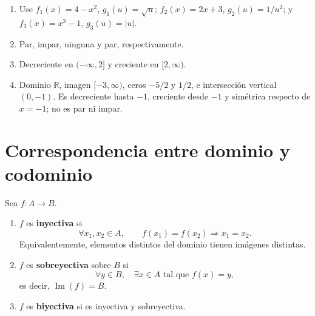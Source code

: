 \documentclass[10pt,a5paper]{article}
\begin{document}
\begin{solucion}
\begin{enumerate}
\[  \]
  \[
  (g\circ f)(x)=x-1,\quad \operatorname{Dom}=[1,\infty).
  \]
  \item Use $f_1(x)=4-x^2$, $g_1(u)=\sqrt{u}$; $f_2(x)=2x+3$, $g_2(u)=1/u^2$; y $f_3(x)=x^3-1$, $g_3(u)=|u|$.
  \item Par, impar, ninguna y par, respectivamente.
  \item Decreciente en $(-\infty,2]$ y creciente en $[2,\infty)$.
  \item Dominio $\mathbb{R}$, imagen $[-3,\infty)$, ceros $-5/2$ y $1/2$, e intersección vertical $(0,-1)$. Es decreciente hasta $-1$, creciente desde $-1$ y simétrica respecto de $x=-1$; no es par ni impar.
\end{enumerate}
\end{solucion}
\fi
\section*{Correspondencia entre dominio y codominio}

\begin{definicion}
Sea $f:A\to B$.
\begin{enumerate}
  \item $f$ es \textbf{inyectiva} si
  \[
  \forall x_1,x_2\in A,\qquad f(x_1)=f(x_2)\Longrightarrow x_1=x_2.
  \]
  Equivalentemente, elementos distintos del dominio tienen imágenes distintas.
  \item $f$ es \textbf{sobreyectiva} sobre $B$ si
  \[
  \forall y\in B,\quad \exists x\in A\text{ tal que }f(x)=y,
  \]
  es decir, $\operatorname{Im}(f)=B$.
  \item $f$ es \textbf{biyectiva} si es inyectiva y sobreyectiva.
\end{enumerate}
\end{definicion}
\end{document}
